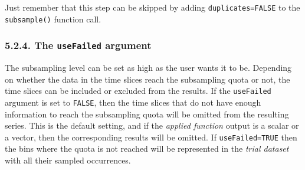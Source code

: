 \documentclass[]{article}
\begin{document}
Just remember that this step can be skipped by adding
\texttt{duplicates=FALSE} to the \texttt{subsample()} function call.

\hypertarget{the-usefailed-argument}{%
\subsubsection{\texorpdfstring{5.2.4. The \texttt{useFailed}
argument}{5.2.4. The useFailed argument}}\label{the-usefailed-argument}}

The subsampling level can be set as high as the user wants it to be.
Depending on whether the data in the time slices reach the subsampling
quota or not, the time slices can be included or excluded from the
results. If the \texttt{useFailed} argument is set to \texttt{FALSE},
then the time slices that do not have enough information to reach the
subsampling quota will be omitted from the resulting series. This is the
default setting, and if the \emph{applied function} output is a scalar
or a vector, then the corresponding results will be omitted. If
\texttt{useFailed=TRUE} then the bins where the quota is not reached
will be represented in the \emph{trial dataset} with all their sampled
occurrences.
\end{document}
